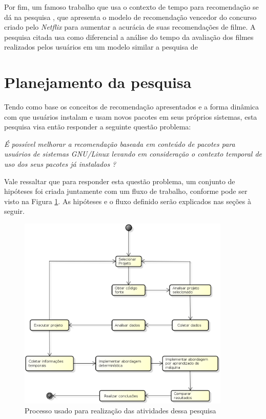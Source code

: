   Por fim, um famoso trabalho que usa o contexto de tempo para recomendação se dá na pesquisa \cite{koren2010collaborative}, que apresenta o modelo de recomendação
  vencedor do concurso criado pelo \textit{Netflix} para aumentar a acurácia de suas recomendações de filme. A pesquisa citada usa como diferencial a análise do tempo da avaliação
  dos filmes realizados pelos usuários em um modelo similar a pesquisa de \cite{basile2015modeling}


  \section{Planejamento da pesquisa}

  Tendo como base os conceitos de recomendação apresentados e a forma dinâmica com
  que usuários instalam e usam novos pacotes em seus próprios sistemas, esta
  pesquisa visa então responder a seguinte questão problema:

  \begin{center}
  \textit{É possível melhorar a recomendação baseada em conteúdo de pacotes para
  usuários de sistemas GNU/Linux levando em consideração o contexto temporal de
  uso dos seus pacotes já instalados ?}
  \end{center}

  Vale ressaltar que para responder esta questão problema, um conjunto de
  hipóteses foi criada juntamente com um fluxo de trabalho, conforme pode ser visto na
  Figura \ref{fig:planejamento_pesquisa}. As hipóteses e o fluxo definido serão
  explicados nas seções à seguir.

  \begin{figure}[h]
    \centering
    \includegraphics[width=0.9\textwidth]{figuras/planejamento_pesquisa.eps}
    \caption{Processo usado para realização das atividades dessa pesquisa}
    \label{fig:planejamento_pesquisa}
  \end{figure}

